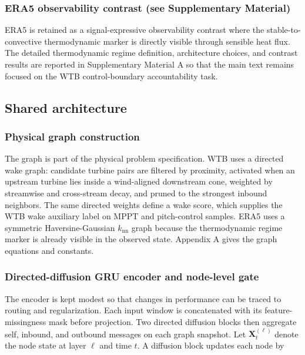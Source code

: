 \documentclass[
  11pt]{article}
\begin{document}
\subsubsection{ERA5 observability contrast (see Supplementary
Material)}\label{era5-observability-contrast-see-supplementary-material}

ERA5 is retained as a signal-expressive observability contrast where the
stable-to-convective thermodynamic marker is directly visible through
sensible heat flux. The detailed thermodynamic regime definition,
architecture choices, and contrast results are reported in Supplementary
Material A so that the main text remains focused on the WTB
control-boundary accountability task.

\subsection{Shared architecture}\label{shared-architecture}

\subsubsection{Physical graph
construction}\label{physical-graph-construction}

The graph is part of the physical problem specification. WTB uses a
directed wake graph: candidate turbine pairs are filtered by proximity,
activated when an upstream turbine lies inside a wind-aligned downstream
cone, weighted by streamwise and cross-stream decay, and pruned to the
strongest inbound neighbors. The same directed weights define a wake
score, which supplies the WTB wake auxiliary label on MPPT and
pitch-control samples. ERA5 uses a symmetric Haversine-Gaussian
\(k_{\mathrm{nn}}\) graph because the thermodynamic regime marker is
already visible in the observed state. Appendix A gives the graph
equations and constants.

\subsubsection{Directed-diffusion GRU encoder and node-level
gate}\label{directed-diffusion-gru-encoder-and-node-level-gate}

The encoder is kept modest so that changes in performance can be traced
to routing and regularization. Each input window is concatenated with
its feature-missingness mask before projection. Two directed diffusion
blocks then aggregate self, inbound, and outbound messages on each graph
snapshot. Let \(\mathbf{X}^{(\ell)}_{t}\) denote the node state at layer
\(\ell\) and time \(t\). A diffusion block updates each node by
\end{document}
